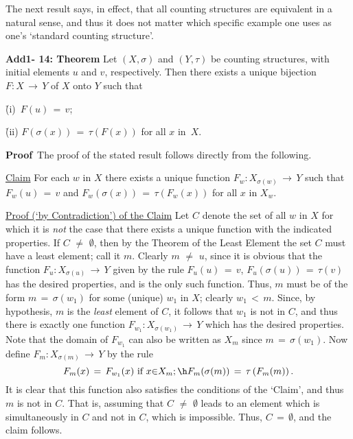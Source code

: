 \V
\V


        The next result says, in effect, that all counting structures are equivalent in a natural sense,
    and thus it does not matter which specific example one uses as one's `standard counting structure'.

\V

        {\bf Add1- 14: Theorem} Let $(X,{\sigma})$ and $(Y,{\tau})$ be counting structures, with initial elements $u$ and $v$, respectively.
    Then there exists a unique bijection $F:X \,{\rightarrow}\, Y$ of $X$ onto $Y$ such that

        \h (i)\, $F(u) \,=\, v$;

        \h (ii) $F({\sigma}(x)) \,=\, {\tau}\left(F(x)\right)$ for all $x$ in~$X$.

\V

        {\bf Proof}\,  The proof of the stated result follows directly from the following.

        \underline{Claim} For each $w$ in $X$ there exists a unique function $F_{w}: X_{{\sigma}(w)} \,{\rightarrow}\, Y$
    such that $F_{w}(u) \,=\, v$ and $F_{w}({\sigma}(x)) \,=\, {\tau}\left(F_{w}(x)\right)$ for all $x$ in $X_{w}$.

        \underline{Proof (`by Contradiction') of the Claim} Let $C$ denote the set of all $w$ in $X$ for which it is {\em not}
    the case that there exists a unique function with the indicated properties.
    If $C \,\,{\neq}\,\, {\emptyset}$, then by the Theorem of the Least Element the set $C$ must have a least element; call it $m$.
    Clearly $m \,\,{\neq}\,\, u$, since it is obvious that the function $F_{u}:X_{{\sigma}(u)} \,{\rightarrow}\, Y$ given by the rule $F_{u}(u) \,=\, v$, $F_{u}({\sigma}(u)) \,=\, {\tau}(v)$ has the desired properties, and is the only such function.
    Thus, $m$ must be of the form $m \,=\, {\sigma}(w_{1})$ for some (unique) $w_{1}$ in $X$; clearly $w_{1}\,<\,m$.
    Since, by hypothesis, $m$ is the {\em least} element of $C$, it follows that $w_{1}$ is not in $C$,
    and thus there is exactly one function $F_{w_{1}}:X_{{\sigma}(w_{1})} \,{\rightarrow}\, Y$ which has the desired properties.
    Note that the domain of $F_{w_{1}}$ can also be written as $X_{m}$ since $m \,=\, {\sigma}(w_{1})$.
    Now define $F_{m}:X_{{\sigma}(m)} \,{\rightarrow}\, Y$ by the rule
        \begin{displaymath}
        F_{m}(x) \,=\, F_{w_{1}}(x) \mbox{ if $x{\in}X_{m}$}; \h F_{m}({\sigma}(m)) \,=\, {\tau}\left(F_{m}(m)\right).
        \end{displaymath}
    It is clear that this function also satisfies the conditions of the `Claim', and thus $m$ is not in $C$.
    That is, assuming that $C \,\,{\neq}\,\, {\emptyset}$ leads to an element which is simultaneously in $C$ and not in $C$, which is impossible.
    Thus, $C \,=\, {\emptyset}$, and the claim follows.

